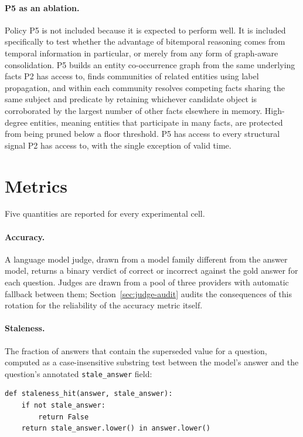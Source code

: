 \paragraph{P5 as an ablation.} Policy P5 is not included because it is expected to perform well. It is included specifically to test whether the advantage of bitemporal reasoning comes from temporal information in particular, or merely from any form of graph-aware consolidation. P5 builds an entity co-occurrence graph from the same underlying facts P2 has access to, finds communities of related entities using label propagation, and within each community resolves competing facts sharing the same subject and predicate by retaining whichever candidate object is corroborated by the largest number of other facts elsewhere in memory. High-degree entities, meaning entities that participate in many facts, are protected from being pruned below a floor threshold. P5 has access to every structural signal P2 has access to, with the single exception of valid time.

\section{Metrics}
\label{sec:metrics}

Five quantities are reported for every experimental cell.

\paragraph{Accuracy.} A language model judge, drawn from a model family different from the answer model, returns a binary verdict of correct or incorrect against the gold answer for each question. Judges are drawn from a pool of three providers with automatic fallback between them; Section~\ref{sec:judge-audit} audits the consequences of this rotation for the reliability of the accuracy metric itself.

\paragraph{Staleness.} The fraction of answers that contain the superseded value for a question, computed as a case-insensitive substring test between the model's answer and the question's annotated \texttt{stale\_answer} field:

\begin{verbatim}
def staleness_hit(answer, stale_answer):
    if not stale_answer:
        return False
    return stale_answer.lower() in answer.lower()
\end{verbatim}

